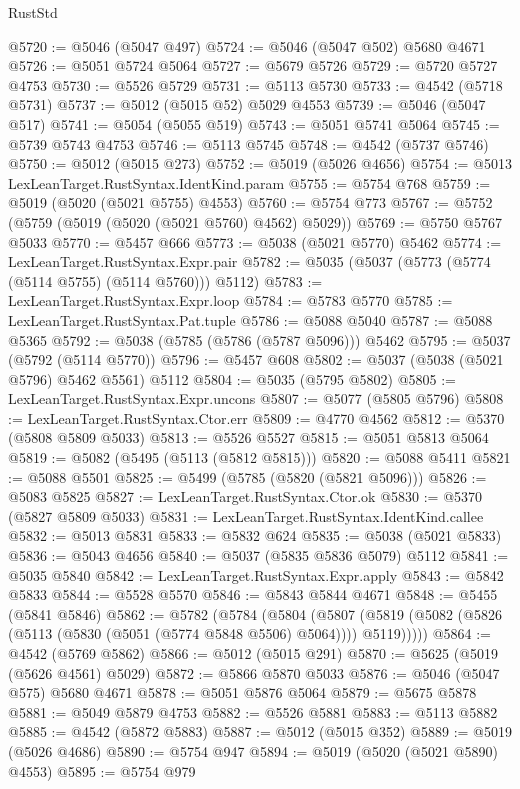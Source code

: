 \begin{lexlean}{RustStd}
\begin{coremodule}
@5720 := @5046 (@5047 @497)
@5724 := @5046 (@5047 @502) @5680 @4671
@5726 := @5051 @5724 @5064
@5727 := @5679 @5726
@5729 := @5720 @5727 @4753
@5730 := @5526 @5729
@5731 := @5113 @5730
@5733 := @4542 (@5718 @5731)
@5737 := @5012 (@5015 @52) @5029 @4553
@5739 := @5046 (@5047 @517)
@5741 := @5054 (@5055 @519)
@5743 := @5051 @5741 @5064
@5745 := @5739 @5743 @4753
@5746 := @5113 @5745
@5748 := @4542 (@5737 @5746)
@5750 := @5012 (@5015 @273)
@5752 := @5019 (@5026 @4656)
@5754 := @5013 LexLeanTarget.RustSyntax.IdentKind.param
@5755 := @5754 @768
@5759 := @5019 (@5020 (@5021 @5755) @4553)
@5760 := @5754 @773
@5767 := @5752 (@5759 (@5019 (@5020 (@5021 @5760) @4562) @5029))
@5769 := @5750 @5767 @5033
@5770 := @5457 @666
@5773 := @5038 (@5021 @5770) @5462
@5774 := LexLeanTarget.RustSyntax.Expr.pair
@5782 := @5035 (@5037 (@5773 (@5774 (@5114 @5755) (@5114 @5760))) @5112)
@5783 := LexLeanTarget.RustSyntax.Expr.loop
@5784 := @5783 @5770
@5785 := LexLeanTarget.RustSyntax.Pat.tuple
@5786 := @5088 @5040
@5787 := @5088 @5365
@5792 := @5038 (@5785 (@5786 (@5787 @5096))) @5462
@5795 := @5037 (@5792 (@5114 @5770))
@5796 := @5457 @608
@5802 := @5037 (@5038 (@5021 @5796) @5462 @5561) @5112
@5804 := @5035 (@5795 @5802)
@5805 := LexLeanTarget.RustSyntax.Expr.uncons
@5807 := @5077 (@5805 @5796)
@5808 := LexLeanTarget.RustSyntax.Ctor.err
@5809 := @4770 @4562
@5812 := @5370 (@5808 @5809 @5033)
@5813 := @5526 @5527
@5815 := @5051 @5813 @5064
@5819 := @5082 (@5495 (@5113 (@5812 @5815)))
@5820 := @5088 @5411
@5821 := @5088 @5501
@5825 := @5499 (@5785 (@5820 (@5821 @5096)))
@5826 := @5083 @5825
@5827 := LexLeanTarget.RustSyntax.Ctor.ok
@5830 := @5370 (@5827 @5809 @5033)
@5831 := LexLeanTarget.RustSyntax.IdentKind.callee
@5832 := @5013 @5831
@5833 := @5832 @624
@5835 := @5038 (@5021 @5833)
@5836 := @5043 @4656
@5840 := @5037 (@5835 @5836 @5079) @5112
@5841 := @5035 @5840
@5842 := LexLeanTarget.RustSyntax.Expr.apply
@5843 := @5842 @5833
@5844 := @5528 @5570
@5846 := @5843 @5844 @4671
@5848 := @5455 (@5841 @5846)
@5862 := @5782
    (@5784
      (@5804
        (@5807 (@5819 (@5082 (@5826 (@5113 (@5830 (@5051 (@5774 @5848 @5506) @5064)))) @5119)))))
@5864 := @4542 (@5769 @5862)
@5866 := @5012 (@5015 @291)
@5870 := @5625 (@5019 (@5626 @4561) @5029)
@5872 := @5866 @5870 @5033
@5876 := @5046 (@5047 @575) @5680 @4671
@5878 := @5051 @5876 @5064
@5879 := @5675 @5878
@5881 := @5049 @5879 @4753
@5882 := @5526 @5881
@5883 := @5113 @5882
@5885 := @4542 (@5872 @5883)
@5887 := @5012 (@5015 @352)
@5889 := @5019 (@5026 @4686)
@5890 := @5754 @947
@5894 := @5019 (@5020 (@5021 @5890) @4553)
@5895 := @5754 @979

\end{coremodule}
\end{lexlean}

